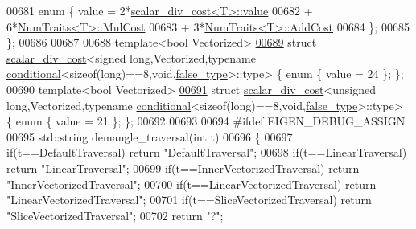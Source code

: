 \begin{DoxyCode}
{00681   \textcolor{keyword}{enum} \{ value = 2*\hyperlink{struct_eigen_1_1internal_1_1scalar__div__cost}{scalar\_div\_cost<T>::value}
00682                + 6*\hyperlink{group___core___module_struct_eigen_1_1_num_traits}{NumTraits<T>::MulCost}
00683                + 3*\hyperlink{group___core___module_struct_eigen_1_1_num_traits}{NumTraits<T>::AddCost}
00684   \};
00685 \};
00686 
00687 
00688 \textcolor{keyword}{template}<\textcolor{keywordtype}{bool} Vectorized>
\hyperlink{struct_eigen_1_1internal_1_1scalar__div__cost_3_01signed_01long_00_01_vectorized_00_01typename_0928d7226c6d88e74072f0f5e87ecaa67}{00689} \textcolor{keyword}{struct }\hyperlink{struct_eigen_1_1internal_1_1scalar__div__cost}{scalar\_div\_cost}<signed long,Vectorized,typename 
      \hyperlink{struct_eigen_1_1internal_1_1conditional}{conditional}<sizeof(long)==8,void,\hyperlink{struct_eigen_1_1internal_1_1false__type}{false\_type}>::type> \{ \textcolor{keyword}{enum} \{ value = 24 \}; \};
00690 \textcolor{keyword}{template}<\textcolor{keywordtype}{bool} Vectorized>
\hyperlink{struct_eigen_1_1internal_1_1scalar__div__cost_3_01unsigned_01long_00_01_vectorized_00_01typenamea197e29684b99203d4e90be10117c3ad}{00691} \textcolor{keyword}{struct }\hyperlink{struct_eigen_1_1internal_1_1scalar__div__cost}{scalar\_div\_cost}<unsigned long,Vectorized,typename 
      \hyperlink{struct_eigen_1_1internal_1_1conditional}{conditional}<sizeof(long)==8,void,\hyperlink{struct_eigen_1_1internal_1_1false__type}{false\_type}>::type> \{ \textcolor{keyword}{enum} \{ value = 21 \}; \};
00692 
00693 
00694 \textcolor{preprocessor}{#ifdef EIGEN\_DEBUG\_ASSIGN}
00695 std::string demangle\_traversal(\textcolor{keywordtype}{int} t)
00696 \{
00697   \textcolor{keywordflow}{if}(t==DefaultTraversal) \textcolor{keywordflow}{return} \textcolor{stringliteral}{"DefaultTraversal"};
00698   \textcolor{keywordflow}{if}(t==LinearTraversal) \textcolor{keywordflow}{return} \textcolor{stringliteral}{"LinearTraversal"};
00699   \textcolor{keywordflow}{if}(t==InnerVectorizedTraversal) \textcolor{keywordflow}{return} \textcolor{stringliteral}{"InnerVectorizedTraversal"};
00700   \textcolor{keywordflow}{if}(t==LinearVectorizedTraversal) \textcolor{keywordflow}{return} \textcolor{stringliteral}{"LinearVectorizedTraversal"};
00701   \textcolor{keywordflow}{if}(t==SliceVectorizedTraversal) \textcolor{keywordflow}{return} \textcolor{stringliteral}{"SliceVectorizedTraversal"};
00702   \textcolor{keywordflow}{return} \textcolor{stringliteral}{"?"};
}
\end{DoxyCode}
